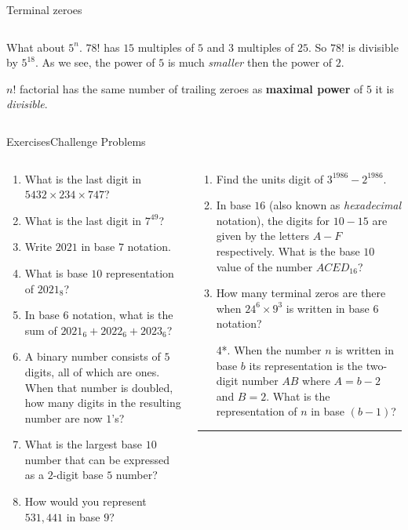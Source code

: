 \documentclass[9pt,aspectratio=169]{beamer}
\begin{document}
\begin{frame}{Terminal zeroes}
\begin{columns}[T]
\begin{column}{0.5\textwidth}
      What about $5^n$. $78!$ has $15$ multiples of $5$ and $3$ multiples of $25$. So $78!$ is divisible by $5^{18}$. As we see, the power of $5$ is much \emph{smaller} then the power of $2$.
      \begin{definition}
        $n!$ factorial has the same number of trailing zeroes as \textbf{maximal power} of $5$ it is \emph{divisible}.
      \end{definition}
    \end{column}
  \end{columns}
\end{frame}

\begin{frame}{Exercises\hspace*{0.35\textwidth}Challenge Problems}
  \begin{columns}[T]
    \begin{column}{0.5\textwidth}
      \begin{enumerate}
        \item What is the last digit in $5432 \times 234 \times 747$?
        \item What is the last digit in $7^{49}$?
        \item Write $2021$ in base $7$ notation.
        \item What is base $10$ representation of $2021_8$?
        \item In base $6$ notation, what is the sum of $2021_6 + 2022_6 +  2023_6$?
        \item A binary number consists of $5$ digits, all of which are ones.  When that number is doubled, how many digits in the resulting number are now $1$’s?
        \item What is the largest base $10$ number that can be expressed as a $2$-digit base $5$ number?
        \item How would you represent $531{,}441$ in base $9$?
      \end{enumerate}
    \end{column}
    \begin{column}{0.5\textwidth}
      \begin{enumerate}
        \item Find the units digit of $3^{1986} - 2^{1986}$.
        \item In base $16$ (also known as \emph{hexadecimal} notation), the digits for $10-15$ are given by the letters $A-F$ respectively.  What is the base $10$ value of the number $ACED_{16}$?
        \item How many terminal zeros are there when $24^6 \times 9^3$ is written in base $6$ notation?
        \item[4*.] When the number $n$ is written in base $b$ its representation is the two-digit number $AB$ where $A = b-2$ and $B = 2$.  What is the representation of $n$ in base $(b-1)$?
      \end{enumerate}
      \vspace*{5\baselineskip}
      \hspace{2em}\rule{0.3\textwidth}{0.2pt}


\end{column}
\end{columns}
\end{frame}
\end{document}
